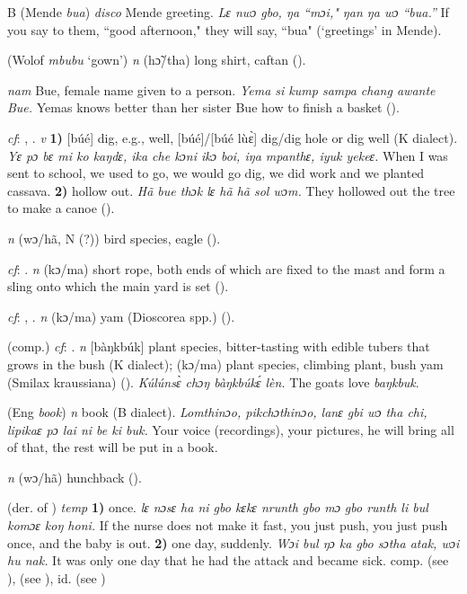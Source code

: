 \begin{letter}{B}
 (Mende \textit{bua}) \textit{disco} Mende greeting. \textit{Lɛ nwɔ gbo, ŋa “mɔi," ŋan ŋa wɔ “bua.”} If you say to them, “good afternoon," they will say, “bua" (‘greetings' in Mende).

 (Wolof \textit{mbubu} ‘gown') \textit{n} (hɔ̃/tha) long shirt, caftan (\citealt{Pichl1967}). 

 \textit{nam} Bue, female name given to a person. \textit{Yema si kump sampa chang awante Bue.} Yemas knows better than her sister Bue how to finish a basket (\citealt{Pichl1967}). 

 \textit{cf}: , . \textit{v} \textbf{1)} [búé] dig, e.g., well, [búé]/[búé lùɛ̀] dig/dig hole or dig well (K dialect). \textit{Yɛ pɔ bɛ mi ko kaŋdɛ, ika che kɔni ikɔ boi, iŋa mpanthɛ, iyuk yekeɛ.} When I was sent to school, we used to go, we would go dig, we did work and we planted cassava. \textbf{2)} hollow out. \textit{Hã bue thɔk lɛ hã hã sol wɔm.} They hollowed out the tree to make a canoe (\citealt{Pichl1967}). 

 \textit{n} (wɔ/hã, N (?)) bird species, eagle (\citealt{Pichl1967}). 

 \textit{cf}: . \textit{n} (kɔ/ma) short rope, both ends of which are fixed to the mast and form a sling onto which the main yard is set (\citealt{Pichl1967}). 

 \textit{cf}: , . \textit{n} (kɔ/ma) yam (Dioscorea spp.) (\citealt{Pichl1967}). 

 (comp.) \textit{cf}: . \textit{n} [bàŋkbúk] plant species, bitter-tasting with edible tubers that grows in the bush (K dialect); (kɔ/ma) plant species, climbing plant, bush yam (Smilax kraussiana) (\citealt{Pichl1967}). \textit{Kúlúnsɛ̀ chɔŋ bàŋkbúkɛ́ lèn.} The goats love \textit{baŋkbuk}.

 (Eng \textit{book}) \textit{n} book (B dialect). \textit{Lomthinɔo, pikchɔthinɔo, lanɛ gbi wɔ tha chi, lipikaɛ pɔ lai ni be ki buk.} Your voice (recordings), your pictures, he will bring all of that, the rest will be put in a book.

 \textit{n} (wɔ/hã) hunchback (\citealt{Pichl1967}). 

 (der. of ) \textit{temp} \textbf{1)} once. \textit{lɛ nɔsɛ ha ni gbo kɛkɛ nrunth gbo mɔ gbo runth li bul komɔɛ koŋ honi.} If the nurse does not make it fast, you just push, you just push once, and the baby is out. \textbf{2)} one day, suddenly. \textit{Wɔi bul ŋɔ ka gbo sɔtha atak, wɔi hu nak.} It was only one day that he had the attack and became sick. comp.  (see ),  (see ), id.  (see )


\end{letter}
